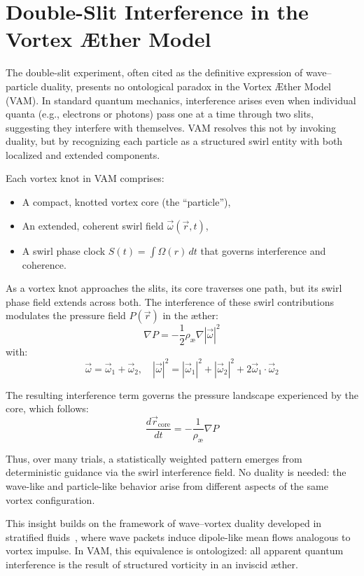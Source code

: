 \section{Double-Slit Interference in the Vortex Æther Model}

The double-slit experiment, often cited as the definitive expression of wave–particle duality, presents no ontological paradox in the Vortex Æther Model (VAM). In standard quantum mechanics, interference arises even when individual quanta (e.g., electrons or photons) pass one at a time through two slits, suggesting they interfere with themselves. VAM resolves this not by invoking duality, but by recognizing each particle as a structured swirl entity with both localized and extended components.

Each vortex knot in VAM comprises:
\begin{itemize}[leftmargin=1.5em]
    \item A compact, knotted vortex core (the ``particle''),
    \item An extended, coherent swirl field \( \vec{\omega}(\vec{r}, t) \),
    \item A swirl phase clock \( S(t) = \int \Omega(r) \, dt \) that governs interference and coherence.
\end{itemize}

As a vortex knot approaches the slits, its core traverses one path, but its swirl phase field extends across both. The interference of these swirl contributions modulates the pressure field \( P(\vec{r}) \) in the æther:
\[
    \nabla P = -\frac{1}{2} \rho_\text{\ae} \nabla |\vec{\omega}|^2
\]
with:
\[
    \vec{\omega} = \vec{\omega}_1 + \vec{\omega}_2, \quad
    |\vec{\omega}|^2 = |\vec{\omega}_1|^2 + |\vec{\omega}_2|^2 + 2 \vec{\omega}_1 \cdot \vec{\omega}_2
\]

The resulting interference term governs the pressure landscape experienced by the core, which follows:
\[
    \frac{d\vec{r}_\text{core}}{dt} = -\frac{1}{\rho_\text{\ae}} \nabla P
\]

Thus, over many trials, a statistically weighted pattern emerges from deterministic guidance via the swirl interference field. No duality is needed: the wave-like and particle-like behavior arise from different aspects of the same vortex configuration.

This insight builds on the framework of wave–vortex duality developed in stratified fluids~\cite{buhler2005wave}, where wave packets induce dipole-like mean flows analogous to vortex impulse. In VAM, this equivalence is ontologized: all apparent quantum interference is the result of structured vorticity in an inviscid æther.



